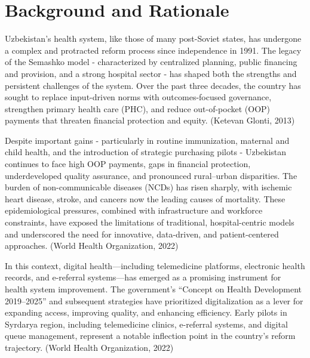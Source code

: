 
\section{\texorpdfstring{\textbf{Background and
Rationale}}{Background and Rationale}}\label{background-and-rationale}

Uzbekistan's health system, like those of many post-Soviet states, has
undergone a complex and protracted reform process since independence in
1991. The legacy of the Semashko model - characterized by centralized
planning, public financing and provision, and a strong hospital sector -
has shaped both the strengths and persistent challenges of the system.
Over the past three decades, the country has sought to replace
input-driven norms with outcomes-focused governance, strengthen primary
health care (PHC), and reduce out-of-pocket (OOP) payments that threaten
financial protection and equity. (Ketevan Glonti, 2013)

Despite important gains - particularly in routine immunization, maternal
and child health, and the introduction of strategic purchasing pilots -
Uzbekistan continues to face high OOP payments, gaps in financial
protection, underdeveloped quality assurance, and pronounced
rural--urban disparities. The burden of non-communicable diseases (NCDs)
has risen sharply, with ischemic heart disease, stroke, and cancers now
the leading causes of mortality. These epidemiological pressures,
combined with infrastructure and workforce constraints, have exposed the
limitations of traditional, hospital-centric models and underscored the
need for innovative, data-driven, and patient-centered approaches.
(World Health Organization, 2022)

In this context, digital health---including telemedicine platforms,
electronic health records, and e-referral systems---has emerged as a
promising instrument for health system improvement. The government's
``Concept on Health Development 2019--2025'' and subsequent strategies
have prioritized digitalization as a lever for expanding access,
improving quality, and enhancing efficiency. Early pilots in Syrdarya
region, including telemedicine clinics, e-referral systems, and digital
queue management, represent a notable inflection point in the country's
reform trajectory. (World Health Organization, 2022)

